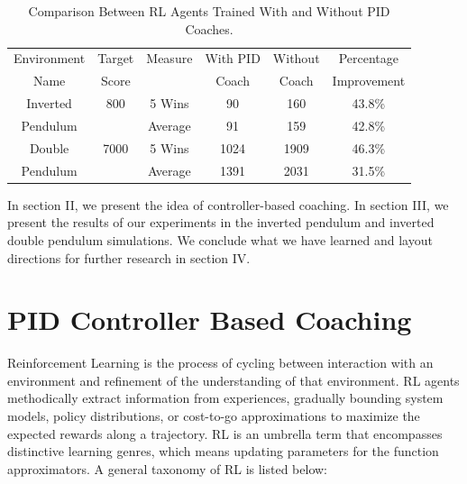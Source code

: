 \documentclass{IJCAS}
\begin{document}
\begin{table}[H]
\scriptsize
\caption{Comparison Between RL Agents Trained With and Without PID Coaches.}
\label{episode_compare}
\centering
\begin{tabular}{ cccccc }
\rowcolor{airforceblue}

Environment & Target & Measure & With PID & Without & Percentage\\
\rowcolor{airforceblue}

Name & Score & & Coach & Coach & Improvement \\
Inverted & 800& 5 Wins & 90 & 160& 43.8\% \\
Pendulum & &Average & 91 & 159& 42.8\%\\
\rowcolor{beaublue}
Double & 7000& 5 Wins & 1024 & 1909& 46.3\%\\
\rowcolor{beaublue}
Pendulum & &Average & 1391 & 2031& 31.5\%\\

\end{tabular}
\end{table}

In section II, we present the idea of controller-based coaching. In section III, we present the results of our experiments in the inverted pendulum and inverted double pendulum simulations. We conclude what we have learned and layout directions for further research in section IV.

\section{PID Controller Based Coaching}

Reinforcement Learning is the process of cycling between interaction with an environment and refinement of the understanding of that environment. RL agents methodically extract information from experiences, gradually bounding system models, policy distributions, or cost-to-go approximations to maximize the expected rewards along a trajectory. RL is an umbrella term that encompasses distinctive learning genres, which means updating parameters for the function approximators. A general taxonomy of RL is listed below:
\end{document}
